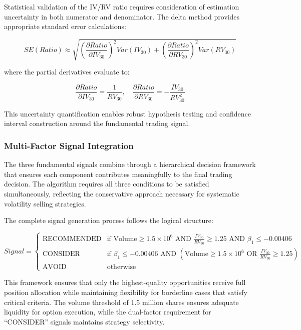 \documentclass[
  american,
  11pt,
  11pt,
  letterpaper,
  onecolumn]{article}
\begin{document}
Statistical validation of the IV/RV ratio requires consideration of
estimation uncertainty in both numerator and denominator. The delta
method provides appropriate standard error calculations:

\[SE(Ratio) \approx \sqrt{\left(\frac{\partial Ratio}{\partial IV_{30}}\right)^2 Var(IV_{30}) + \left(\frac{\partial Ratio}{\partial RV_{30}}\right)^2 Var(RV_{30})}\]

where the partial derivatives evaluate to:

\[\frac{\partial Ratio}{\partial IV_{30}} = \frac{1}{RV_{30}}, \quad \frac{\partial Ratio}{\partial RV_{30}} = -\frac{IV_{30}}{RV_{30}^2}\]

This uncertainty quantification enables robust hypothesis testing and
confidence interval construction around the fundamental trading signal.

\subsubsection{Multi-Factor Signal
Integration}\label{multi-factor-signal-integration}

The three fundamental signals combine through a hierarchical decision
framework that ensures each component contributes meaningfully to the
final trading decision. The algorithm requires all three conditions to
be satisfied simultaneously, reflecting the conservative approach
necessary for systematic volatility selling strategies.

The complete signal generation process follows the logical structure:

\[Signal = \begin{cases}
\text{RECOMMENDED} & \text{if } \text{Volume} \geq 1.5 \times 10^6 \text{ AND } \frac{IV_{30}}{RV_{30}} \geq 1.25 \text{ AND } \beta_1 \leq -0.00406 \\
\text{CONSIDER} & \text{if } \beta_1 \leq -0.00406 \text{ AND } (\text{Volume} \geq 1.5 \times 10^6 \text{ OR } \frac{IV_{30}}{RV_{30}} \geq 1.25) \\
\text{AVOID} & \text{otherwise}
\end{cases}\]

This framework ensures that only the highest-quality opportunities
receive full position allocation while maintaining flexibility for
borderline cases that satisfy critical criteria. The volume threshold of
1.5 million shares ensures adequate liquidity for option execution,
while the dual-factor requirement for ``CONSIDER'' signals maintains
strategy selectivity.
\end{document}

